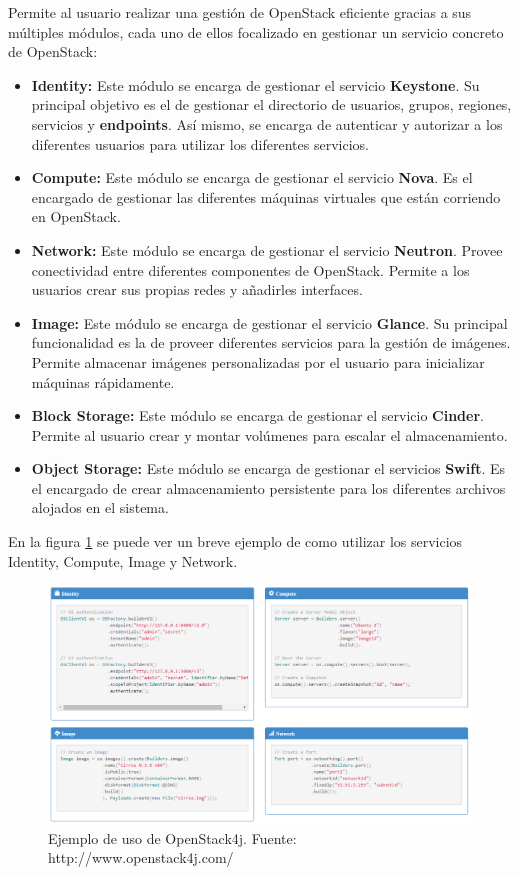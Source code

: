 Permite al usuario realizar una gestión de OpenStack eficiente gracias a sus múltiples módulos, cada uno de ellos focalizado en gestionar un servicio concreto de OpenStack:

\begin{itemize}
	\item \textbf{Identity:} Este módulo se encarga de gestionar el servicio \textbf{Keystone}. Su principal objetivo es el de gestionar el directorio de usuarios, grupos, regiones, servicios y \textbf{endpoints}. Así mismo, se encarga de autenticar y autorizar a los diferentes usuarios para utilizar los diferentes servicios.
	
	\item \textbf{Compute:} Este módulo se encarga de gestionar el servicio \textbf{Nova}. Es el encargado de gestionar las diferentes máquinas virtuales que están corriendo en OpenStack.
	
	\item \textbf{Network:} Este módulo se encarga de gestionar el servicio \textbf{Neutron}. Provee conectividad entre diferentes componentes de OpenStack. Permite a los usuarios crear sus propias redes y añadirles interfaces.
	
	\item \textbf{Image:} Este módulo se encarga de gestionar el servicio \textbf{Glance}. Su principal funcionalidad es la de proveer diferentes servicios para la gestión de imágenes. Permite almacenar imágenes personalizadas por el usuario para inicializar máquinas rápidamente.
	
	\item \textbf{Block Storage:} Este módulo se encarga de gestionar el servicio \textbf{Cinder}. Permite al usuario crear y montar volúmenes para escalar el almacenamiento.
	
	\item \textbf{Object Storage:} Este módulo se encarga de gestionar el servicios \textbf{Swift}. Es el encargado de crear almacenamiento persistente para los diferentes archivos alojados en el sistema.
\end{itemize}

En la figura \ref{fig:ejemploos4j} se puede ver un breve ejemplo de como utilizar los servicios Identity, Compute, Image y Network.

\begin{figure}[!ht]
	\centering
	\includegraphics[width=0.8\linewidth]{imagenes/ejemplo_os4j}
	\caption{Ejemplo de uso de OpenStack4j. Fuente: http://www.openstack4j.com/}
	\label{fig:ejemploos4j}
\end{figure}


\cleardoublepage
